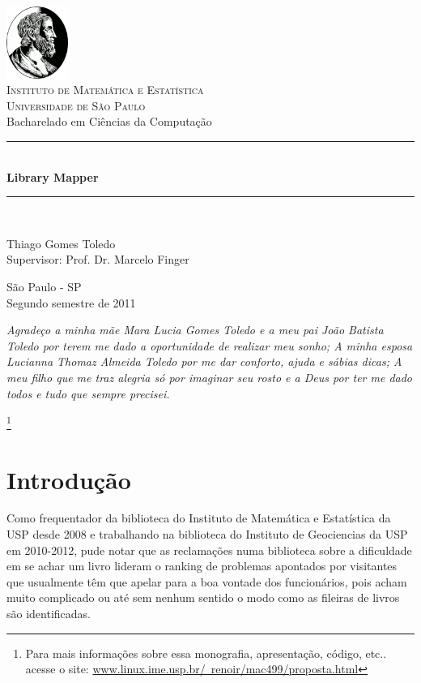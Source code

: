 \documentclass[a4paper,10pt]{article}
\newcommand{\HRule}{\rule{\linewidth}{0.5mm}}
\begin{document}
\begin{titlepage}

\begin{center}
\includegraphics[width=0.15\textwidth]{./imgs/IME.png}\\[1cm]
\textsc{\Large Instituto de Matemática e Estatística\\ Universidade de São Paulo}\\[0.5cm]
{\large Bacharelado em Ciências da Computação}\\[5.0cm]
\HRule \\[0.4cm]
{\huge \bfseries Library Mapper} 
\HRule \\[1.0cm]

\begin{flushleft} \large
{\large Thiago Gomes Toledo\\ Supervisor: Prof. Dr. Marcelo Finger}
\end{flushleft}
\vfill

{\large São Paulo - SP\\[0.5cm] Segundo semestre de 2011}
\end{center}
\end{titlepage}

\newpage

\textit{ Agradeço a minha mãe Mara Lucia Gomes Toledo e a meu pai João Batista Toledo por terem me dado a oportunidade de realizar 
meu sonho; A minha esposa Lucianna Thomaz Almeida Toledo por me dar conforto, ajuda e sábias dicas; A meu filho que me traz
alegria só por imaginar seu rosto e a Deus por ter me dado todos e tudo que sempre precisei.}


\footnote[1]{Para mais informações sobre essa monografia, apresentação, código, etc.. acesse o site: \href{''http://www.linux.ime.usp.br/~renoir/mac499/proposta.html''}{www.linux.ime.usp.br/~renoir/mac499/proposta.html}}
\newpage
 \tableofcontents
\newpage
    \section{Introdução}
   
    Como frequentador da biblioteca do Instituto de Matemática e 
    Estatística da USP desde 2008 e trabalhando na biblioteca do Instituto de Geociencias da USP em 2010-2012, 
    pude notar que as reclamações numa biblioteca sobre a dificuldade em se achar um livro lideram o ranking de 
    problemas apontados por visitantes que usualmente têm que apelar para a boa vontade dos funcionários, 
    pois acham muito complicado ou até sem nenhum sentido o modo como as fileiras de livros são identificadas.\\
    
\end{document}
